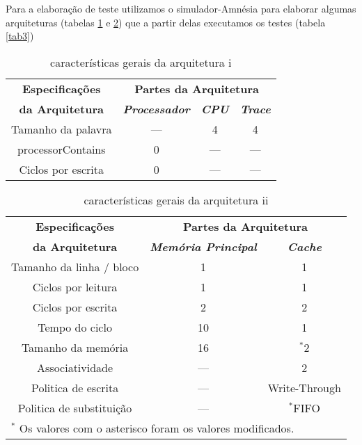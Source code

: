 \documentclass[conference]{IEEEtran}
\begin{document}
  Para a elaboração de teste utilizamos o simulador-Amnésia para elaborar algumas
arquiteturas (tabelas \ref{tab1} e \ref{tab2}) que a partir delas executamos os testes (tabela \ref{tab3})
\begin{table}[H]
  \caption{características gerais da arquitetura i}
    \centering
      \begin{tabular}{|c|c|c|c|}
          \hline
          \textbf{Especificações} & \multicolumn{3}{|c|}{\textbf{Partes da Arquitetura}} \\
          \cline{2-4} 
          \textbf{da Arquitetura} & \textbf{\textit{Processador}}& \textbf{\textit{CPU}}& \textbf{\textit{Trace}} \\
          \hline
          Tamanho da palavra & --- & 4 & 4 \\
          \hline
          processorContains & 0 & --- & --- \\
          \hline
          Ciclos por escrita & 0 & --- & --- \\
          \hline
      \end{tabular}
      \label{tab1}
\end{table}

\begin{table}[H]
  \caption{características gerais da arquitetura ii}
  \centering
      \begin{tabular}{|c|c|c|}
          \hline
          \textbf{Especificações} & \multicolumn{2}{|c|}{\textbf{Partes da Arquitetura}} \\
          \cline{2-3} 
          \textbf{da Arquitetura} & \textbf{\textit{Memória Principal}}& \textbf{\textit{Cache}} \\
          \hline
          Tamanho da linha / bloco & 1 & 1  \\
          \hline
          Ciclos por leitura & 1 & 1  \\
          \hline
          Ciclos por escrita & 2 & 2  \\
          \hline
          Tempo do ciclo & 10 & 1  \\
          \hline
          Tamanho da memória & 16 & {$^{\mathrm{*}}$}2  \\
          \hline
          Associatividade & --- & 2  \\
          \hline
          Politica de escrita & --- & Write-Through  \\
          \hline
          Politica de substituição & --- & {$^{\mathrm{*}}$}FIFO  \\
          \hline
          \multicolumn{3}{l}{$^{\mathrm{*}}$ Os valores com o asterisco foram os valores modificados.}
      \end{tabular}
      \label{tab2}
\end{table}
\end{document}
